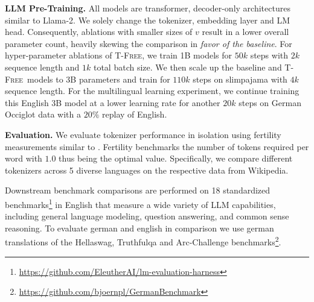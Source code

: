 \documentclass[11pt]{article}
\newcommand{\method}{\textsc{T-Free}}
\begin{document}
\textbf{LLM Pre-Training.}
All models are transformer, decoder-only architectures similar to Llama-2. We solely change the tokenizer, embedding layer and LM head. Consequently, ablations with smaller sizes of $v$ result in a lower overall parameter count, heavily skewing the comparison in \textit{favor of the baseline}. 
For hyper-parameter ablations of \method, we train 1B models for $50k$ steps with $2k$ sequence length and $1k$ total batch size.
We then scale up the baseline and \method\ models to 3B parameters and train for $110k$ steps on slimpajama with $4k$ sequence length. For the multilingual learning experiment, we continue training this English 3B model at a lower learning rate for another $20k$ steps on German Occiglot data with a $20\%$ replay of English.  




\textbf{Evaluation.} 
We evaluate tokenizer performance in isolation using fertility measurements similar to \citet{rust2021howGood}. Fertility benchmarks the number of tokens required per word with $1.0$ thus being the optimal value.
Specifically, we 
compare different tokenizers across 5 diverse languages on the respective data from Wikipedia. 

Downstream benchmark comparisons are performed on 18 standardized benchmarks\footnote{\scriptsize\url{https://github.com/EleutherAI/lm-evaluation-harness}} in English that measure a wide variety of LLM capabilities, including general language modeling, question answering, and common sense reasoning. 
To evaluate german and english in comparison we use german translations of the Hellaswag, Truthfulqa and Arc-Challenge benchmarks\footnote{\url{https://github.com/bjoernpl/GermanBenchmark}}.
\end{document}
